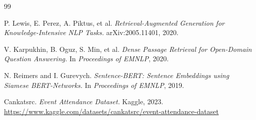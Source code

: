 \documentclass[paper=a4, fontsize=11pt]{scrartcl}
\begin{document}
\begin{thebibliography}{99}

P. Lewis, E. Perez, A. Piktus, et al.
\newblock \textit{Retrieval-Augmented Generation for Knowledge-Intensive NLP Tasks.}
\newblock arXiv:2005.11401, 2020.

V. Karpukhin, B. Oguz, S. Min, et al.
\newblock \textit{Dense Passage Retrieval for Open-Domain Question Answering.}
\newblock In \textit{Proceedings of EMNLP}, 2020.

N. Reimers and I. Gurevych.
\newblock \textit{Sentence-BERT: Sentence Embeddings using Siamese BERT-Networks.}
\newblock In \textit{Proceedings of EMNLP}, 2019.

Cankatsrc.
\newblock \textit{Event Attendance Dataset.}
\newblock Kaggle, 2023.
\newblock \url{https://www.kaggle.com/datasets/cankatsrc/event-attendance-dataset}

\end{thebibliography}
\end{document}
